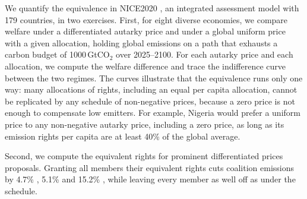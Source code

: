 \documentclass[12pt,english]{article}
\theoremstyle{remark}
\begin{document}
We quantify the equivalence in NICE2020 \citep{young-brun_within-country_2025}, an integrated assessment model with 179 countries, %
in two exercises. First, for eight diverse economies, we compare welfare under a differentiated autarky price and under a global uniform price with a given allocation, holding global emissions on a path that exhausts a carbon budget of 1000\,GtCO$_2$ over 2025--2100. For each autarky price and each allocation, we compute the welfare difference and trace the indifference curve between the two regimes. %
The curves illustrate that the equivalence runs only one way: many allocations of rights, including an equal per capita allocation, cannot be replicated by any schedule of non-negative prices, because a zero price is not enough to compensate low emitters.
For example, Nigeria would prefer a uniform price to any non-negative autarky price, including a zero price, as long as its emission rights per capita are at least 40\% of the global average. %

Second, we compute the equivalent rights for prominent differentiated prices proposals. %
Granting all members their equivalent rights cuts coalition emissions by 4.7\% \citep{banerjee_grand_2025}, 5.1\% \citep{wolfram_building_2025}
and 15.2\% \citep{equal_right_climate_2023}, while leaving every member as well off as under the schedule. 
\end{document}
